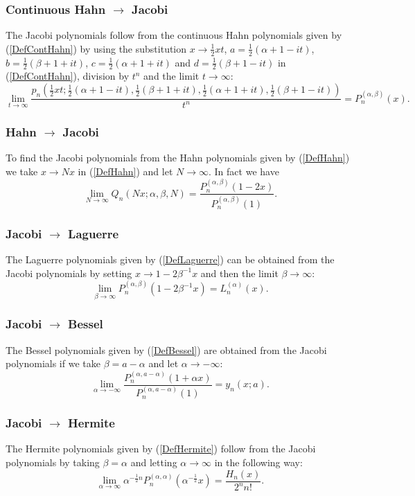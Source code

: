 \documentclass[envcountchap,graybox]{svmono}
\newcounter{rom}
\begin{document}
\subsubsection*{Continuous Hahn $\rightarrow$ Jacobi}
The Jacobi polynomials follow from the continuous Hahn polynomials given by (\ref{DefContHahn})
by using the substitution $x\rightarrow \frac{1}{2}xt$, $a=\frac{1}{2}(\alpha+1-it)$,
$b=\frac{1}{2}(\beta+1+it)$, $c=\frac{1}{2}(\alpha+1+it)$ and $d=\frac{1}{2}(\beta+1-it)$
in (\ref{DefContHahn}), division by $t^n$ and the limit $t\rightarrow\infty$:
$$\lim_{t\rightarrow\infty}
\frac{p_n(\frac{1}{2}xt;\frac{1}{2}(\alpha+1-it),\frac{1}{2}(\beta+1+it),
\frac{1}{2}(\alpha+1+it),\frac{1}{2}(\beta+1-it))}{t^n}=P_n^{(\alpha,\beta)}(x).$$

\subsubsection*{Hahn $\rightarrow$ Jacobi}
To find the Jacobi polynomials from the Hahn polynomials given by (\ref{DefHahn}) we take
$x\rightarrow Nx$ in (\ref{DefHahn}) and let $N\rightarrow\infty$. In fact we have
$$\lim_{N\rightarrow\infty}
Q_n(Nx;\alpha,\beta,N)=\frac{P_n^{(\alpha,\beta)}(1-2x)}{P_n^{(\alpha,\beta)}(1)}.$$

\subsubsection*{Jacobi $\rightarrow$ Laguerre}
The Laguerre polynomials given by (\ref{DefLaguerre}) can be obtained from the Jacobi
polynomials by setting $x\rightarrow 1-2\beta^{-1}x$ and then the limit $\beta\rightarrow\infty$:
\begin{equation}
\lim_{\beta\rightarrow\infty}
P_n^{(\alpha,\beta)}(1-2\beta^{-1}x)=L_n^{(\alpha)}(x).
\end{equation}

\subsubsection*{Jacobi $\rightarrow$ Bessel}
The Bessel polynomials given by (\ref{DefBessel}) are obtained from the Jacobi polynomials
if we take $\beta=a-\alpha$ and let $\alpha\rightarrow-\infty$:
\begin{equation}
\lim_{\alpha\rightarrow-\infty}
\frac{P_n^{(\alpha,a-\alpha)}(1+\alpha x)}{P_n^{(\alpha,a-\alpha)}(1)}=y_n(x;a).
\end{equation}

\subsubsection*{Jacobi $\rightarrow$ Hermite}
The Hermite polynomials given by (\ref{DefHermite}) follow from the Jacobi polynomials
by taking $\beta=\alpha$ and letting $\alpha\rightarrow\infty$ in the following way:
\begin{equation}
\lim_{\alpha\rightarrow\infty}
\alpha^{-\frac{1}{2}n}P_n^{(\alpha,\alpha)}(\alpha^{-\frac{1}{2}}x)=\frac{H_n(x)}{2^nn!}.
\end{equation}
\end{document}
